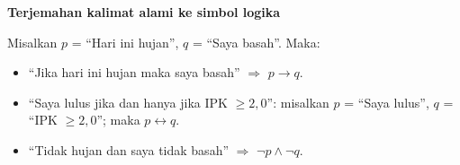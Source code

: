 \begin{contoh}
\textbf{Terjemahan kalimat alami ke simbol logika} \cite{forallx,rosen2019}

Misalkan $p$ = ``Hari ini hujan'', $q$ = ``Saya basah''. Maka:
\begin{itemize}
  \item ``Jika hari ini hujan maka saya basah'' $\Rightarrow$ $p \rightarrow q$.
  \item ``Saya lulus jika dan hanya jika IPK $\geq 2{,}0$'': misalkan $p$ = ``Saya lulus'', $q$ = ``IPK $\geq 2{,}0$''; maka $p \leftrightarrow q$.
  \item ``Tidak hujan dan saya tidak basah'' $\Rightarrow$ $\neg p \wedge \neg q$.
\end{itemize}
\end{contoh}
